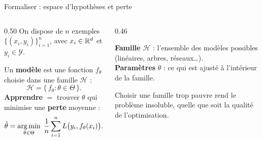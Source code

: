 
\begin{frame}{Formaliser : espace d'hypothèses et perte}
\begin{columns}[t]
\begin{column}{0.50\textwidth}
On dispose de $n$ exemples $\{(x_i, y_i)\}_{i=1}^n$, avec
$x_i \in \mathbb{R}^d$ et $y_i \in \mathcal{Y}$.

\vspace{1mm}
Un \textbf{modèle} est une fonction $f_\theta$ choisie dans une famille
$\mathcal{H}$ :
\[
  \mathcal{H} = \{\, f_\theta : \theta \in \Theta \,\}.
\]
\textbf{Apprendre} $=$ trouver $\theta$ qui minimise une \textbf{perte}
moyenne :
\[
  \hat\theta = \operatorname*{arg\,min}_{\theta \in \Theta}\;
  \frac{1}{n}\sum_{i=1}^{n} L\big(y_i, f_\theta(x_i)\big).
\]
\end{column}
\begin{column}{0.46\textwidth}
\begin{kbox}
\textbf{Famille} $\mathcal{H}$ : l'ensemble des modèles possibles
(linéaires, arbres, réseaux\ldots).\\[2pt]
\textbf{Paramètres} $\theta$ : ce qui est ajusté à l'intérieur de la famille.
\end{kbox}
\begin{wbox}[Conséquence]
Choisir une famille trop pauvre rend le problème insoluble, quelle que soit la
qualité de l'optimisation.
\end{wbox}
\end{column}
\end{columns}
\end{frame}

